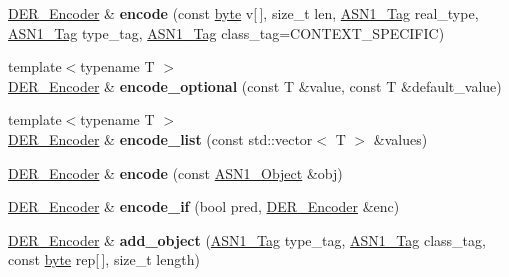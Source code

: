 \begin{DoxyCompactItemize}
\item 
\hypertarget{classBotan_1_1DER__Encoder_a34c7872e7f553f9a5f9d0548f1118c25}{\hyperlink{classBotan_1_1DER__Encoder}{D\-E\-R\-\_\-\-Encoder} \& {\bfseries encode} (const \hyperlink{namespaceBotan_a7d793989d801281df48c6b19616b8b84}{byte} v\mbox{[}$\,$\mbox{]}, size\-\_\-t len, \hyperlink{namespaceBotan_aaa08f67a945ef195fa39e62659dffa7a}{A\-S\-N1\-\_\-\-Tag} real\-\_\-type, \hyperlink{namespaceBotan_aaa08f67a945ef195fa39e62659dffa7a}{A\-S\-N1\-\_\-\-Tag} type\-\_\-tag, \hyperlink{namespaceBotan_aaa08f67a945ef195fa39e62659dffa7a}{A\-S\-N1\-\_\-\-Tag} class\-\_\-tag=C\-O\-N\-T\-E\-X\-T\-\_\-\-S\-P\-E\-C\-I\-F\-I\-C)}\label{classBotan_1_1DER__Encoder_a34c7872e7f553f9a5f9d0548f1118c25}

\item 
\hypertarget{classBotan_1_1DER__Encoder_a099ea86c7832553a26bb97424501291e}{{\footnotesize template$<$typename T $>$ }\\\hyperlink{classBotan_1_1DER__Encoder}{D\-E\-R\-\_\-\-Encoder} \& {\bfseries encode\-\_\-optional} (const T \&value, const T \&default\-\_\-value)}\label{classBotan_1_1DER__Encoder_a099ea86c7832553a26bb97424501291e}

\item 
\hypertarget{classBotan_1_1DER__Encoder_a2bccaec76825ce5f82edacb5c7fe4876}{{\footnotesize template$<$typename T $>$ }\\\hyperlink{classBotan_1_1DER__Encoder}{D\-E\-R\-\_\-\-Encoder} \& {\bfseries encode\-\_\-list} (const std\-::vector$<$ T $>$ \&values)}\label{classBotan_1_1DER__Encoder_a2bccaec76825ce5f82edacb5c7fe4876}

\item 
\hypertarget{classBotan_1_1DER__Encoder_a3f8cef5192ee0377c835bab806e3ac56}{\hyperlink{classBotan_1_1DER__Encoder}{D\-E\-R\-\_\-\-Encoder} \& {\bfseries encode} (const \hyperlink{classBotan_1_1ASN1__Object}{A\-S\-N1\-\_\-\-Object} \&obj)}\label{classBotan_1_1DER__Encoder_a3f8cef5192ee0377c835bab806e3ac56}

\item 
\hypertarget{classBotan_1_1DER__Encoder_aacc0ee804cc75ef7f441d6c338040342}{\hyperlink{classBotan_1_1DER__Encoder}{D\-E\-R\-\_\-\-Encoder} \& {\bfseries encode\-\_\-if} (bool pred, \hyperlink{classBotan_1_1DER__Encoder}{D\-E\-R\-\_\-\-Encoder} \&enc)}\label{classBotan_1_1DER__Encoder_aacc0ee804cc75ef7f441d6c338040342}

\item 
\hypertarget{classBotan_1_1DER__Encoder_a597fe3ec687fc8f3ab7211b04d25714d}{\hyperlink{classBotan_1_1DER__Encoder}{D\-E\-R\-\_\-\-Encoder} \& {\bfseries add\-\_\-object} (\hyperlink{namespaceBotan_aaa08f67a945ef195fa39e62659dffa7a}{A\-S\-N1\-\_\-\-Tag} type\-\_\-tag, \hyperlink{namespaceBotan_aaa08f67a945ef195fa39e62659dffa7a}{A\-S\-N1\-\_\-\-Tag} class\-\_\-tag, const \hyperlink{namespaceBotan_a7d793989d801281df48c6b19616b8b84}{byte} rep\mbox{[}$\,$\mbox{]}, size\-\_\-t length)}\label{classBotan_1_1DER__Encoder_a597fe3ec687fc8f3ab7211b04d25714d}


\end{DoxyCompactItemize}
